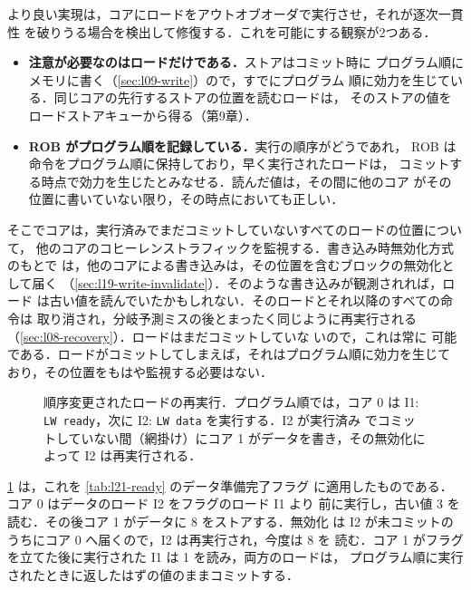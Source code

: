 \documentclass[../main.tex]{subfiles}
\begin{document}
より良い実現は，コアにロードをアウトオブオーダで実行させ，それが逐次一貫性
を破りうる場合を検出して修復する．これを可能にする観察が2つある．
\begin{itemize}
  \item \textbf{注意が必要なのはロードだけである．}ストアはコミット時に
    プログラム順にメモリに書く（\cref{sec:l09-write}）ので，すでにプログラム
    順に効力を生じている．同じコアの先行するストアの位置を読むロードは，
    そのストアの値をロードストアキューから得る（第9章）．
  \item \textbf{ROB がプログラム順を記録している．}実行の順序がどうであれ，
    ROB は命令をプログラム順に保持しており，早く実行されたロードは，
    コミットする時点で効力を生じたとみなせる．読んだ値は，その間に他のコア
    がその位置に書いていない限り，その時点においても正しい．
\end{itemize}
そこでコアは，実行済みでまだコミットしていないすべてのロードの位置について，
他のコアのコヒーレンストラフィックを監視する．書き込み時無効化方式のもとで
は，他のコアによる書き込みは，その位置を含むブロックの無効化として届く
（\cref{sec:l19-write-invalidate}）．そのような書き込みが観測されれば，ロード
は古い値を読んでいたかもしれない．そのロードとそれ以降のすべての命令は
取り消され，分岐予測ミスの後とまったく同じように再実行される
（\cref{sec:l08-recovery}）．ロードはまだコミットしていな
いので，これは常に
可能である．ロードがコミットしてしまえば，それはプログラム順に効力を生じて
おり，その位置をもはや監視する必要はない．

\begin{figure}[htbp]
  \centering
  
  \caption{順序変更されたロードの再実行．プログラム順では，コア 0 は I1:
    \texttt{LW ready}，次に I2: \texttt{LW data} を実行する．I2 が実行済み
    でコミットしていない間（網掛け）にコア 1 がデータを書き，その無効化に
    よって I2 は再実行される．}
  \label{fig:l21-replay}
\end{figure}

\cref{fig:l21-replay} は，これを \cref{tab:l21-ready} のデータ準備完了フラグ
に適用したものである．コア 0 はデータのロード I2 をフラグのロード I1 より
前に実行し，古い値 3 を読む．その後コア 1 がデータに 8 をストアする．無効化
は I2 が未コミットのうちにコア 0 へ届くので，I2 は再実行され，今度は 8 を
読む．コア 1 がフラグを立てた後に実行された I1 は 1 を読み，両方のロードは，
プログラム順に実行されたときに返したはずの値のままコミットする．
\end{document}
